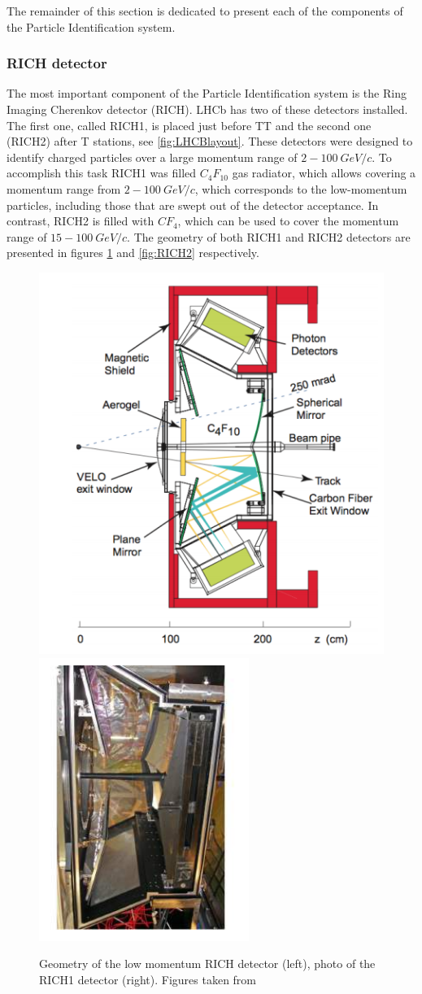 The remainder of this section is dedicated to present each of the components of the Particle Identification system.


\subsubsection{RICH detector}

The most important component of the Particle Identification system is the Ring Imaging Cherenkov detector (RICH). LHCb has two of these detectors installed. The first one, called RICH1, is placed just before TT and the second one (RICH2) after T stations, see \ref{fig:LHCBlayout}. These detectors were designed to identify charged particles over a large momentum range of $2-100~ GeV/c$. To accomplish this task RICH1 was filled $C_4F_{10}$ gas radiator, which allows covering a momentum range from $2-100~ GeV/c$, which corresponds to the low-momentum particles, including those that are swept out of the detector acceptance. In contrast, RICH2 is filled with $CF_4$, which can be used to cover the momentum range of  $15-100~ GeV/c$. The geometry of both RICH1 and RICH2 detectors are presented in figures \ref{fig:RICH1} and \ref{fig:RICH2} respectively. 


\begin{figure}[h]
 \begin{center}
  \includegraphics[width=0.49\linewidth]{figures/RICH1.PNG}
   \includegraphics[width=0.49\linewidth]{figures/RICH1_photo.PNG}
    \caption{Geometry of the low momentum RICH detector (left), photo of the RICH1 detector (right). Figures taken from \cite{lhcb}}%
\label{fig:RICH1}%
 \end{center}
\end{figure}


